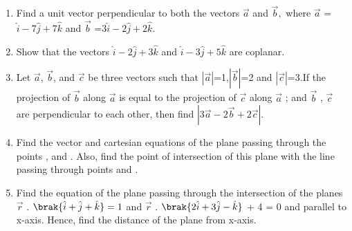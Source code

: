 
\begin{enumerate}

\item Find a unit vector perpendicular to both the vectors $\overrightarrow{a} $ and $\overrightarrow{b} ,$ where 
       $\overrightarrow{a} $ =$\hat{i} -7 \hat{j} + 7\hat{k}$ and
       $\overrightarrow{b} $ =$3\hat{i} -2 \hat{j} + 2\hat{k}.$
       

    \item Show that the vectors $\hat{i} -2 \hat{j} + 3\hat{k}$ and $\hat{i} -3 \hat{j} + 5\hat{k}$
are coplanar.
    \item Let $\overrightarrow{a} $,\hspace{5pt} $\overrightarrow{b} $, and \hspace{5pt}$\overrightarrow{c} $ be three vectors such that $|\overrightarrow{a}|$=1,\hspace{5pt}$|\overrightarrow{b}|$=2 and \hspace{5pt}$|\overrightarrow{c}|$=3.If the projection of \hspace{5pt}$\overrightarrow{b} $ along \hspace{5pt}$\overrightarrow{a}$ is equal to the projection of \hspace{5pt}$\overrightarrow{c} $ along \hspace{5pt}$\overrightarrow{a}$ ; and  \hspace{5pt}$\overrightarrow{b} $ , \hspace{5pt}$\overrightarrow{c} $ are perpendicular to each other, then find $|3 \overrightarrow{a}- 2 \overrightarrow{b} + 2\overrightarrow{c} |$.
    \item Find the vector and cartesian equations of the plane passing through the points ,   and . Also, find the point of intersection of this plane with the line passing through points  and .

    \item Find the equation of the plane passing through the intersection of the planes $\overrightarrow{r}$ .\hspace{1.5pt} $\brak{\hat{i} + \hat{j} + \hat{k}} =1 $ and $\overrightarrow{r}$ .\hspace{1.5pt} $\brak{2\hat{i} + 3\hat{j} - \hat{k}}$ + 4 = 0 and parallel to x-axis. Hence, find the distance of the plane from x-axis.

 \end{enumerate}
